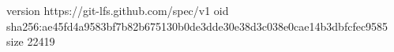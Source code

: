 version https://git-lfs.github.com/spec/v1
oid sha256:ae45fd4a9583bf7b82b675130b0de3dde30e38d3c038e0cae14b3dbfcfec9585
size 22419
